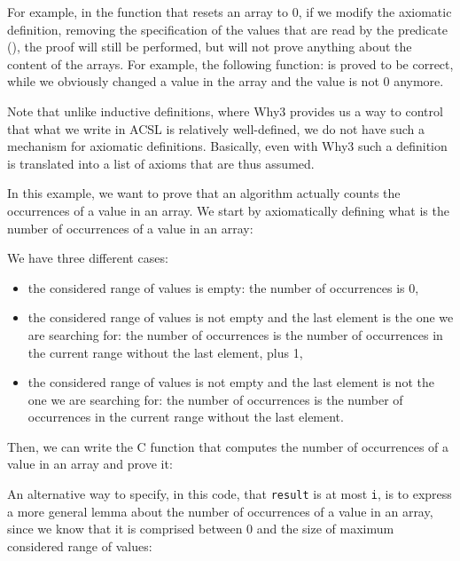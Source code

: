 For example, in the function that resets an array to 0, if we modify the
axiomatic definition, removing the specification of the values that are
read by the predicate (), the proof
will still be performed, but will not prove anything about the content
of the arrays. For example, the following function:
is proved to be correct, while we obviously changed a value in the array
and the value is not 0 anymore.



Note that unlike inductive definitions, where Why3 provides us a way to control
that what we write in ACSL is relatively well-defined, we do not have such a
mechanism for axiomatic definitions. Basically, even with Why3 such a definition
is translated into a list of axioms that are thus assumed.





In this example, we want to prove that an algorithm actually counts the
occurrences of a value in an array. We start by axiomatically defining
what is the number of occurrences of a value in an array:






We have three different cases:
\begin{itemize}
\item
  the considered range of values is empty: the number of occurrences is
  0,
\item
  the considered range of values is not empty and the last element is
  the one we are searching for: the number of occurrences is the number of
  occurrences in the current range without the last element, plus 1,
\item
  the considered range of values is not empty and the last element is
  not the one we are searching for: the number of occurrences is the number
  of occurrences in the current range without the last element.
\end{itemize}
Then, we can write the C function that computes the number of
occurrences of a value in an array and prove it:






An alternative way to specify, in this code, that \texttt{result} is at
most \texttt{i}, is to express a more general lemma about the number of
occurrences of a value in an array, since we know that it is
comprised between 0 and the size of maximum considered range of values:



